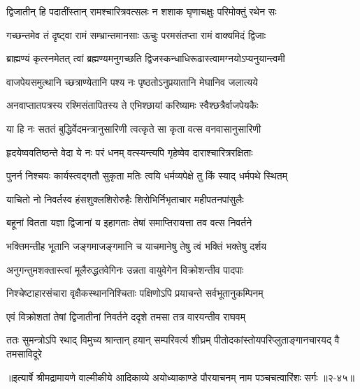 \twolineshloka
{द्विजातीन् हि पदातींस्तान् रामश्चारित्रवत्सलः}
{न शशाक घृणाचक्षुः परिमोक्तुं रथेन सः} %

\twolineshloka
{गच्छन्तमेव तं दृष्ट्वा रामं सम्भ्रान्तमानसाः}
{ऊचुः परमसंतप्ता रामं वाक्यमिदं द्विजाः} %

\twolineshloka
{ब्राह्मण्यं कृत्स्नमेतत् त्वां ब्रह्मण्यमनुगच्छति}
{द्विजस्कन्धाधिरूढास्त्वामग्नयोऽप्यनुयान्त्वमी} %

\twolineshloka
{वाजपेयसमुत्थानि च्छत्राण्येतानि पश्य नः}
{पृष्ठतोऽनुप्रयातानि मेघानिव जलात्यये} %

\twolineshloka
{अनवाप्तातपत्रस्य रश्मिसंतापितस्य ते}
{एभिश्छायां करिष्यामः स्वैश्छत्रैर्वाजपेयकैः} %

\twolineshloka
{या हि नः सततं बुद्धिर्वेदमन्त्रानुसारिणी}
{त्वत्कृते सा कृता वत्स वनवासानुसारिणी} %

\twolineshloka
{हृदयेष्ववतिष्ठन्ते वेदा ये नः परं धनम्}
{वत्स्यन्त्यपि गृहेष्वेव दाराश्चारित्ररक्षिताः} %

\twolineshloka
{पुनर्न निश्चयः कार्यस्त्वद्गतौ सुकृता मतिः}
{त्वयि धर्मव्यपेक्षे तु किं स्याद् धर्मपथे स्थितम्} %

\twolineshloka
{याचितो नो निवर्तस्व हंसशुक्लशिरोरुहैः}
{शिरोभिर्निभृताचार महीपतनपांसुलैः} %

\twolineshloka
{बहूनां वितता यज्ञा द्विजानां य इहागताः}
{तेषां समाप्तिरायत्ता तव वत्स निवर्तने} %

\twolineshloka
{भक्तिमन्तीह भूतानि जङ्गमाजङ्गमानि च}
{याचमानेषु तेषु त्वं भक्तिं भक्तेषु दर्शय} %

\twolineshloka
{अनुगन्तुमशक्तास्त्वां मूलैरुद्धतवेगिनः}
{उन्नता वायुवेगेन विक्रोशन्तीव पादपाः} %

\twolineshloka
{निश्चेष्टाहारसंचारा वृक्षैकस्थाननिश्चिताः}
{पक्षिणोऽपि प्रयाचन्ते सर्वभूतानुकम्पिनम्} %

\twolineshloka
{एवं विक्रोशतां तेषां द्विजातीनां निवर्तने}
{ददृशे तमसा तत्र वारयन्तीव राघवम्} %

\twolineshloka
{ततः सुमन्त्रोऽपि रथाद् विमुच्य श्रान्तान् हयान् सम्परिवर्त्य शीघ्रम्}
{पीतोदकांस्तोयपरिप्लुताङ्गानचारयद् वै तमसाविदूरे} %


॥इत्यार्षे श्रीमद्रामायणे वाल्मीकीये आदिकाव्ये अयोध्याकाण्डे पौरयाचनम् नाम पञ्चचत्वारिंशः सर्गः ॥२-४५॥
